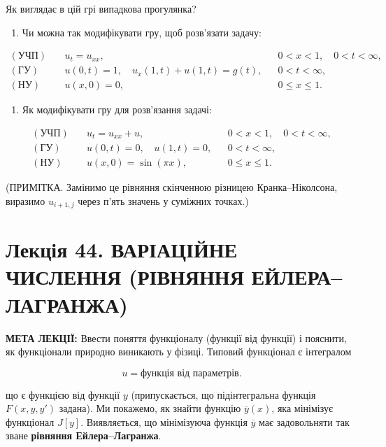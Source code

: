 \documentclass[
  ukrainian,
]{article}
\providecommand{\tightlist}{%
  \setlength{\itemsep}{0pt}\setlength{\parskip}{0pt}}
\begin{document}
Як виглядає в цій грі випадкова прогулянка?

\begin{enumerate}
\def\labelenumi{\arabic{enumi}.}
\setcounter{enumi}{3}
\tightlist
\item
  Чи можна так модифікувати гру, щоб розв'язати задачу:
\end{enumerate}

\[
\begin{aligned}
(\text{УЧП})\quad & u_t=u_{xx}, && 0<x<1,\quad 0<t<\infty,\\
(\text{ГУ})\quad & u(0,t)=1,\quad u_x(1,t)+u(1,t)=g(t), && 0<t<\infty,\\
(\text{НУ})\quad & u(x,0)=0, && 0\le x\le 1.
\end{aligned}
\]

\begin{enumerate}
\def\labelenumi{\arabic{enumi}.}
\setcounter{enumi}{4}
\tightlist
\item
  Як модифікувати гру для розв'язання задачі:
\end{enumerate}

\[
\begin{aligned}
(\text{УЧП})\quad & u_t=u_{xx}+u, && 0<x<1,\quad 0<t<\infty,\\
(\text{ГУ})\quad & u(0,t)=0,\quad u(1,t)=0, && 0<t<\infty,\\
(\text{НУ})\quad & u(x,0)=\sin(\pi x), && 0\le x\le 1.
\end{aligned}
\]

(ПРИМІТКА. Замінимо це рівняння скінченною різницею Кранка--Ніколсона,
виразимо \(u_{i+1,j}\) через п'ять значень у суміжних точках.)

\section{Лекція 44. ВАРІАЦІЙНЕ ЧИСЛЕННЯ (РІВНЯННЯ
ЕЙЛЕРА--ЛАГРАНЖА)}\label{ux43bux435ux43aux446ux456ux44f-44.-ux432ux430ux440ux456ux430ux446ux456ux439ux43dux435-ux447ux438ux441ux43bux435ux43dux43dux44f-ux440ux456ux432ux43dux44fux43dux43dux44f-ux435ux439ux43bux435ux440ux430ux43bux430ux433ux440ux430ux43dux436ux430}

\textbf{МЕТА ЛЕКЦІЇ:} Ввести поняття функціоналу (функції від функції) і
пояснити, як функціонали природно виникають у фізиці. Типовий функціонал
є інтегралом

\[
u = \text{функція від параметрів}.
\]

що є функцією від функції \(y\) (припускається, що підінтегральна
функція \(F(x, y, y')\) задана). Ми покажемо, як знайти функцію
\(\overline{y}(x)\), яка мінімізує функціонал \(J[y]\). Виявляється, що
мінімізуюча функція \(\overline{y}\) має задовольняти так зване
\textbf{рівняння Ейлера--Лагранжа}.
\end{document}
